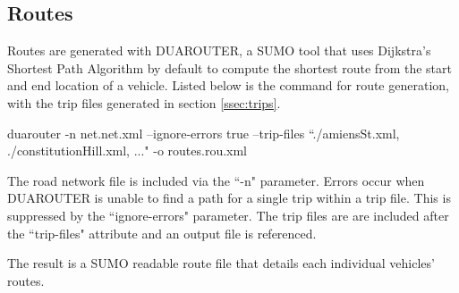 \subsection{Routes}
Routes are generated with DUAROUTER, a \ac{SUMO} tool that uses Dijkstra's Shortest Path Algorithm by default to compute the shortest route from the start and end location of a vehicle. Listed below is the command for route generation, with the trip files generated in section \ref{ssec:trips}.

\begin{displayquote}
    duarouter -n net.net.xml --ignore-errors true --trip-files ``./amiensSt.xml, ./constitutionHill.xml, ..." -o routes.rou.xml
\end{displayquote}

The road network file is included via the ``-n" parameter. Errors occur when DUAROUTER is unable to find a path for a single trip within a trip file. This is suppressed by the ``ignore-errors" parameter. The trip files are are included after the ``trip-files" attribute and an output file is referenced.

The result is a \ac{SUMO} readable route file that details each individual vehicles' routes.
